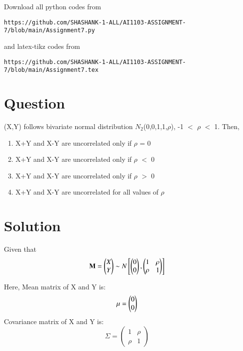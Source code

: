 \documentclass[journal,12pt,twocolumn]{IEEEtran}
\begin{document}
Download all python codes from
\begin{lstlisting}
https://github.com/SHASHANK-1-ALL/AI1103-ASSIGNMENT-7/blob/main/Assignment7.py
\end{lstlisting}
%
and latex-tikz codes from 
%
\begin{lstlisting}
https://github.com/SHASHANK-1-ALL/AI1103-ASSIGNMENT-7/blob/main/Assignment7.tex
\end{lstlisting}
\section*{\textbf{Question}}
(X,Y) follows bivariate normal distribution $N_2$(0,0,1,1,$\rho$),  -1 $<$ $\rho$ $<$ 1. Then,
\begin{enumerate}
    \item X+Y and X-Y are uncorrelated only if $\rho$ = 0
    \item X+Y and X-Y are uncorrelated only if $\rho$ $<$ 0
    \item X+Y and X-Y are uncorrelated only if $\rho$ $>$ 0
    \item X+Y and X-Y are uncorrelated for all values of $\rho$
\end{enumerate}

\section*{\textbf{Solution}}
Given that 
\begin{equation}
 \mathbf{M} = \begin{pmatrix} X \\ Y\end{pmatrix}
    \sim N \begin{bmatrix}
        \begin{pmatrix}0 \\ 0\end{pmatrix},
        \begin{pmatrix}
            1 & \rho\\
            \rho & 1 
        \end{pmatrix}
    \end{bmatrix}
\end{equation}

Here, Mean matrix of X and Y is:
\begin{equation}
    \mu = \begin{pmatrix}0 \\ 0\end{pmatrix}
\end{equation}
Covariance matrix of X and Y is:
\begin{equation}
\Sigma = \begin{pmatrix}
            1 & \rho\\
            \rho & 1 
        \end{pmatrix}
\end{equation}
\end{document}
